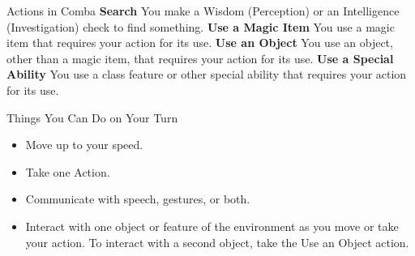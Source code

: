 \documentclass[a4paper,10pt,twoside,twocolumn]{dndbook} %
\begin{document}
\begin{DndSidebar}{Actions in Comba}
		\textbf{Search}\linebreak
		You make a Wisdom (Perception) or an Intelligence (Investigation) check to find something.\linebreak
		\textbf{Use a Magic Item}\linebreak
		You use a magic item that requires your action for its use.\linebreak
		\textbf{Use an Object}\linebreak
		You use an object, other than a magic item, that requires your action for its use.\linebreak
		\textbf{Use a Special Ability}\linebreak
		You use a class feature or other special ability that requires your action for its use.\linebreak
	\end{DndSidebar}
	\begin{DndSidebar}{Things You Can Do on Your Turn}
		\begin{itemize}
			\item Move up to your speed.
			\item Take one Action.
			\item Communicate with speech, gestures, or both.
			\item Interact with one object or feature of the environment as you move or take your action. To interact with a second object, take the Use an Object action.
		\end{itemize}
	\end{DndSidebar}
\end{document}
